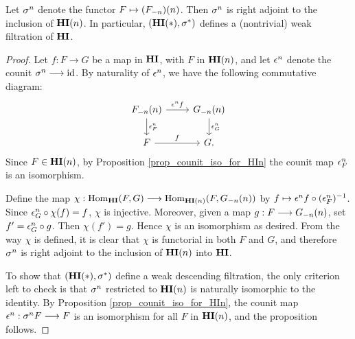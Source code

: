 \begin{prop}\label{prop_HI_upper_slice}
Let $\sgHI{n}$ denote the functor $F \mapsto 
\LHI[n]{(\RHI[n]{F})}$. Then $\sgHI{n}$ is right adjoint to the 
inclusion of $\LHI[n]{\HI}$. In particular, $(\LHI[*]{\HI}, 
\sgHI{*})$ defines a (nontrivial) weak filtration of $\HI$.
\end{prop}
\begin{proof}
Let $f: F \to G$ be a map in $\HI$, with $F$ in $\LHI[n]{\HI}$,
and let $\cuHI^n$ denote the counit $\sgHI{n} \to \id$.
By naturality of $\cuHI^n$, we have the following commutative 
diagram:
\[
\begin{tikzcd}
\LHI[n]{\RHI[n]{F}} \arrow{r}{\cuHI^n f}\arrow{d}{\cuHI^n_F} 
& \LHI[n]{\RHI[n]{G}} \arrow{d}{\cuHI^n_G} \\
F \arrow{r}{f}
& G.
\end{tikzcd}
\]
Since $F \in \LHI[n]{\HI}$, by Proposition 
\ref{prop_counit_iso_for_HIn} the counit map $\cuHI^n_F$ is an 
isomorphism.

Define the map $\chi: \homHI(F, G) \to \hom_{\LHI[n]{\HI}}(F, 
\LHI[n]{\RHI[n]{G}})$ by $f \mapsto 
\cuHI^n f \comp (\cuHI^n_F)^{-1}$. Since $\cuHI^n_G \comp \chi(f) 
= f$, $\chi$ is injective.  Moreover, given a map $g: F 
\to \LHI[n]{\RHI[n]{G}}$, set $f' = \cuHI_G^n \comp g$. Then 
$\chi(f') = g$. Hence $\chi$ is an isomorphism as desired.
From the way $\chi$ is defined, it is clear that $\chi$ is 
functorial in both $F$ and $G$, and therefore $\sgHI{n}$ is
right adjoint to the inclusion of $\LHI[n]{\HI}$ into $\HI$.

To show that $(\LHI[*]{\HI}, \sgHI{*})$ define a weak descending
filtration, the only criterion left to check is that $\sgHI{n}$
restricted to $\LHI[n]{\HI}$ is naturally isomorphic to the
identity. By Proposition \ref{prop_counit_iso_for_HIn}, the
counit map $\cuHI^n: \sgHI{n} F \to F$ is an isomorphism for
all $F$ in $\LHI[n]{\HI}$, and the proposition follows.
\end{proof}

